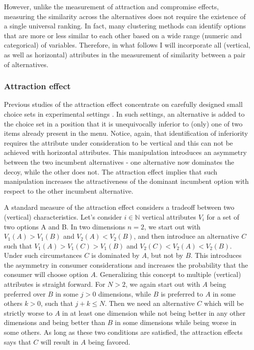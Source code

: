 \documentclass[a4paper,12pt]{article}
\begin{document}
However, unlike the measurement of attraction and compromise effects, measuring the similarity across the alternatives does not require the existence of a single universal ranking. In fact, many clustering methods can identify options that are more or less similar to each other based on a wide range (numeric and categorical) of variables. Therefore, in what follows I will incorporate all (vertical, as well as horizontal) attributes in the measurement of similarity between a pair of alternatives.

\subsubsection{Attraction effect}

Previous studies of the attraction effect concentrate on carefully designed small choice sets in experimental settings \citep{huberEtAl82, huberPuto83}. In such settings, an alternative is added to the choice set in a position that it is unequivocally inferior to (only) one of two items already present in the menu. Notice, again, that identification of inferiority requires the attribute under consideration to be vertical and this can not be achieved with horizontal attributes. This manipulation introduces an asymmetry between the two incumbent alternatives - one alternative now dominates the decoy, while the other does not. The attraction effect implies that such manipulation increases the attractiveness of the dominant incumbent option with respect to the other incumbent alternative. 

A standard measure of the attraction effect considers a tradeoff between two (vertical) characteristics. Let's consider $i \in \mathbb{N}$ vertical attributes  $V_i$ for a set of two options A and B. In two dimensions $n = 2$, we start out with $V_1(A) > V_1(B)$ and $V_2(A) < V_2(B)$, and then introduce an alternative $C$ such that $V_1(A) > V_1(C) > V_1(B)$ and $V_2(C) < V_2(A) < V_2(B)$. Under such circumstances $C$ is dominated by $A$, but not by $B$. This introduces the asymmetry in consumer considerations and increases the probability that the consumer will choose option $A$. Generalizing this concept to multiple (vertical) attributes is straight forward. For $N > 2$, we again start out with $A$ being preferred over $B$ in some $j > 0$ dimensions, while $B$ is preferred to $A$ in some others $k > 0$, such that $j+k \le N$. Then we need an alternative $C$ which will be strictly worse to $A$ in at least one dimension while not being better in any other dimensions and being better than $B$ in some dimensions while being worse in some others. As long as these two conditions are satisfied, the attraction effects says that $C$ will result in $A$ being favored. 
\end{document}
